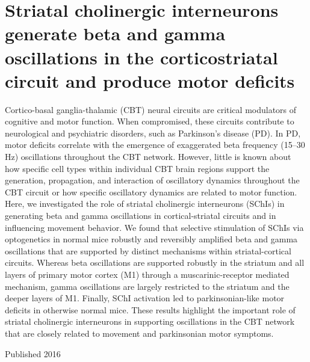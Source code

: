 \section*{Striatal cholinergic interneurons generate beta and gamma oscillations in the corticostriatal circuit and produce motor deficits}

Cortico-basal ganglia-thalamic (CBT) neural circuits are critical modulators of cognitive and motor function.
When compromised, these circuits contribute to neurological and psychiatric disorders, such as Parkinson’s disease (PD).
In PD, motor deficits correlate with the emergence of exaggerated beta frequency (15–30 Hz) oscillations throughout the CBT network.
However, little is known about how specific cell types within individual CBT brain regions support the generation, propagation, and interaction of oscillatory dynamics throughout the CBT circuit or how specific oscillatory dynamics are related to motor function.
Here, we investigated the role of striatal cholinergic interneurons (SChIs) in generating beta and gamma oscillations in cortical-striatal circuits and in influencing movement behavior.
We found that selective stimulation of SChIs via optogenetics in normal mice robustly and reversibly amplified beta and gamma oscillations that are supported by distinct mechanisms within striatal-cortical circuits.
Whereas beta oscillations are supported robustly in the striatum and all layers of primary motor cortex (M1) through a muscarinic-receptor mediated mechanism, gamma oscillations are largely restricted to the striatum and the deeper layers of M1.
Finally, SChI activation led to parkinsonian-like motor deficits in otherwise normal mice.
These results highlight the important role of striatal cholinergic interneurons in supporting oscillations in the CBT network that are closely related to movement and parkinsonian motor symptoms.

Published 2016 \cite{Kondabolu_2016}

